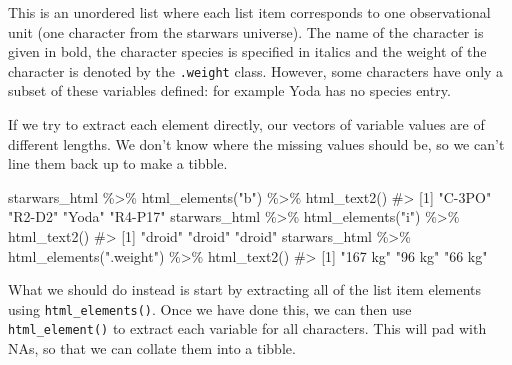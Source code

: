 \documentclass[
  letterpaper,
  DIV=11,
  numbers=noendperiod]{scrreprt}
\newenvironment{Shaded}{\begin{snugshade}}{\end{snugshade}}
\newcommand{\CommentTok}[1]{\textcolor[rgb]{0.37,0.37,0.37}{#1}}
\newcommand{\FunctionTok}[1]{\textcolor[rgb]{0.28,0.35,0.67}{#1}}
\newcommand{\NormalTok}[1]{\textcolor[rgb]{0.00,0.23,0.31}{#1}}
\newcommand{\SpecialCharTok}[1]{\textcolor[rgb]{0.37,0.37,0.37}{#1}}
\newcommand{\StringTok}[1]{\textcolor[rgb]{0.13,0.47,0.30}{#1}}
\begin{document}
This is an unordered list where each list item corresponds to one
observational unit (one character from the starwars universe). The name
of the character is given in bold, the character species is specified in
italics and the weight of the character is denoted by the
\texttt{.weight} class. However, some characters have only a subset of
these variables defined: for example Yoda has no species entry.

If we try to extract each element directly, our vectors of variable
values are of different lengths. We don't know where the missing values
should be, so we can't line them back up to make a tibble.

\begin{Shaded}
\begin{Highlighting}[]
\NormalTok{starwars\_html }\SpecialCharTok{\%\textgreater{}\%} \FunctionTok{html\_elements}\NormalTok{(}\StringTok{"b"}\NormalTok{) }\SpecialCharTok{\%\textgreater{}\%} \FunctionTok{html\_text2}\NormalTok{()}
\CommentTok{\#\textgreater{} [1] "C{-}3PO"  "R2{-}D2"  "Yoda"   "R4{-}P17"}
\NormalTok{starwars\_html }\SpecialCharTok{\%\textgreater{}\%} \FunctionTok{html\_elements}\NormalTok{(}\StringTok{"i"}\NormalTok{) }\SpecialCharTok{\%\textgreater{}\%} \FunctionTok{html\_text2}\NormalTok{()}
\CommentTok{\#\textgreater{} [1] "droid" "droid" "droid"}
\NormalTok{starwars\_html }\SpecialCharTok{\%\textgreater{}\%} \FunctionTok{html\_elements}\NormalTok{(}\StringTok{".weight"}\NormalTok{) }\SpecialCharTok{\%\textgreater{}\%} \FunctionTok{html\_text2}\NormalTok{()}
\CommentTok{\#\textgreater{} [1] "167 kg" "96 kg"  "66 kg"}
\end{Highlighting}
\end{Shaded}

What we should do instead is start by extracting all of the list item
elements using \texttt{html\_elements()}. Once we have done this, we can
then use \texttt{html\_element()} to extract each variable for all
characters. This will pad with NAs, so that we can collate them into a
tibble.
\end{document}
